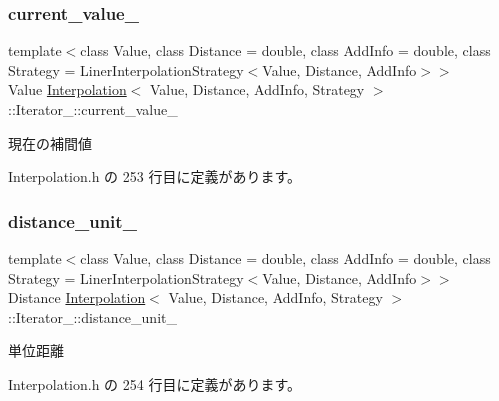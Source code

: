 \subsubsection{\texorpdfstring{current\+\_\+value\+\_\+}{current\_value\_}}
{\footnotesize\ttfamily template$<$class Value, class Distance = double, class Add\+Info = double, class Strategy = Liner\+Interpolation\+Strategy$<$\+Value, Distance, Add\+Info$>$$>$ \\
Value \mbox{\hyperlink{class_interpolation}{Interpolation}}$<$ Value, Distance, Add\+Info, Strategy $>$\+::Iterator\+\_\+\+::current\+\_\+value\+\_\+\hspace{0.3cm}{\ttfamily [private]}}



現在の補間値 



 Interpolation.\+h の 253 行目に定義があります。

\mbox{\label{class_interpolation_1_1_iterator___a7bbbda549ad4929ca4230f9e492a8377}} 
\subsubsection{\texorpdfstring{distance\+\_\+unit\+\_\+}{distance\_unit\_}}
{\footnotesize\ttfamily template$<$class Value, class Distance = double, class Add\+Info = double, class Strategy = Liner\+Interpolation\+Strategy$<$\+Value, Distance, Add\+Info$>$$>$ \\
Distance \mbox{\hyperlink{class_interpolation}{Interpolation}}$<$ Value, Distance, Add\+Info, Strategy $>$\+::Iterator\+\_\+\+::distance\+\_\+unit\+\_\+\hspace{0.3cm}{\ttfamily [private]}}



単位距離 



 Interpolation.\+h の 254 行目に定義があります。

\mbox{\label{class_interpolation_1_1_iterator___a7f82f4aca84c8510f9f6eb7467ba1963}} 

